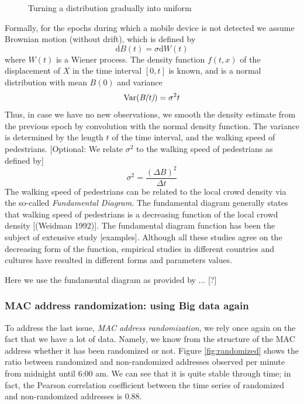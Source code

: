 \documentclass[10pt,a4paper]{article}
\begin{document}
\begin{figure}[h!]
\begin{subfigure}{.3\textwidth}
	\end{subfigure}
	\caption{Turning a distribution gradually into uniform}
	\label{fig:uniform}
\end{figure}

Formally, for the epochs during which a mobile device is not detected we assume Brownian motion (without drift), which is defined by
\begin{equation}
\text{d}B(t)=\sigma\text{d}W(t)
\end{equation}
where $W(t)$ is a Wiener process. The density function $f(t,x)$ of the displacement of $X$ in the time interval $[0,t]$ is known, and is a normal distribution with mean $B(0)$ and variance
\begin{equation}
\text{Var(\textit{B(t)})}=\sigma^{2}t
\end{equation}
Thus, in case we have no new observations, we smooth the density estimate from the previous epoch by convolution with the normal density function. 
The variance is determined by the length $t$ of the time interval, and the walking speed of pedestrians.
[Optional: We relate $\sigma^2$ to the walking speed of pedestrians as defined by]
\begin{equation}
\sigma^2=\frac{(\Delta B)^2}{\Delta t}
\end{equation}
The walking speed of pedestrians can be related to the local crowd density via the so-called \textit{Fundamental Diagram}. 
The fundamental diagram generally states that walking speed of pedestrians is a decreasing function of the local crowd density [(Weidman 1992)].
The fundamental diagram function has been the subject of extensive study [examples].
Although all these studies agree on the decreasing form of the function, empirical studies in different countries and cultures have resulted in different forms and parameters values.

Here we use the fundamental diagram as provided by ... [?]


\subsubsection{MAC address randomization: using Big data again}

To address the last issue, {\it MAC address randomization}, we rely once again on the fact that we have a lot of data. Namely, we know from the structure of the MAC address whether it has been randomized or not. Figure \ref{fig:randomized} shows the ratio between randomized and non-randomized addresses observed per minute from midnight until 6:00 am. We can see that it is quite stable through time; in fact, the Pearson correlation coefficient between the time series of randomized and non-randomized addresses is 0.88. 
\end{document}
